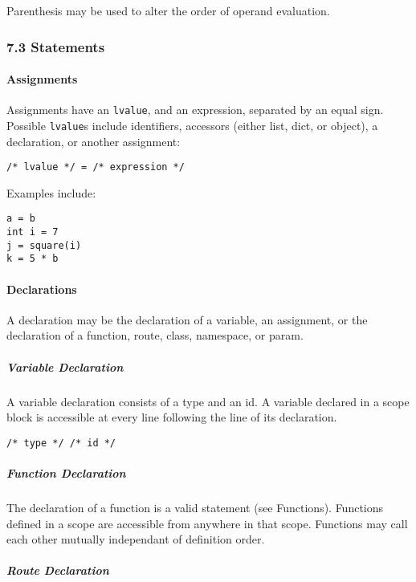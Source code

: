 Parenthesis may be used to alter the order of operand evaluation.

\subsubsection*{7.3 Statements}\label{statements}

\paragraph{Assignments}\label{assignments}

Assignments have an \texttt{lvalue}, and an expression, separated by an
equal sign. Possible \texttt{lvalue}s include identifiers, accessors
(either list, dict, or object), a declaration, or another assignment:

\begin{verbatim}
/* lvalue */ = /* expression */
\end{verbatim}

Examples include:

\begin{verbatim}
a = b
int i = 7
j = square(i)
k = 5 * b
\end{verbatim}

\paragraph{Declarations}\label{declarations}

A declaration may be the declaration of a variable, an assignment, or
the declaration of a function, route, class, namespace, or param.

\subparagraph{Variable Declaration}\label{variable-declaration}

A variable declaration consists of a type and an id. A variable declared
in a scope block is accessible at every line following the line of its
declaration.

\begin{verbatim}
/* type */ /* id */
\end{verbatim}

\subparagraph{Function Declaration}\label{function-declaration}

The declaration of a function is a valid statement (see Functions).
Functions defined in a scope are accessible from anywhere in that scope.
Functions may call each other mutually independant of definition order.

\subparagraph{Route Declaration}\label{route-declaration}


